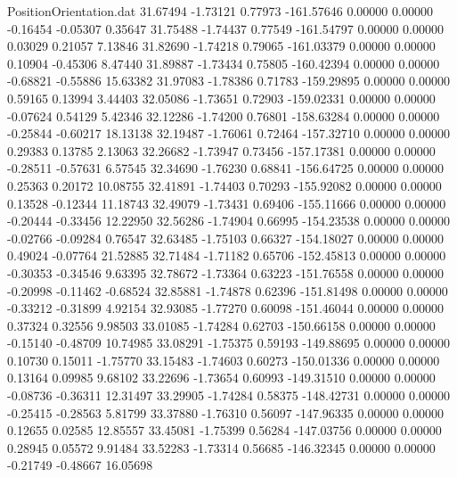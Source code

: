 \begin{filecontents}{PositionOrientation.dat}
  31.67494   -1.73121    0.77973  -161.57646    0.00000    0.00000   -0.16454   -0.05307    0.35647
  31.75488   -1.74437    0.77549  -161.54797    0.00000    0.00000    0.03029    0.21057    7.13846
  31.82690   -1.74218    0.79065  -161.03379    0.00000    0.00000    0.10904   -0.45306    8.47440
  31.89887   -1.73434    0.75805  -160.42394    0.00000    0.00000   -0.68821   -0.55886   15.63382
  31.97083   -1.78386    0.71783  -159.29895    0.00000    0.00000    0.59165    0.13994    3.44403
  32.05086   -1.73651    0.72903  -159.02331    0.00000    0.00000   -0.07624    0.54129    5.42346
  32.12286   -1.74200    0.76801  -158.63284    0.00000    0.00000   -0.25844   -0.60217   18.13138
  32.19487   -1.76061    0.72464  -157.32710    0.00000    0.00000    0.29383    0.13785    2.13063
  32.26682   -1.73947    0.73456  -157.17381    0.00000    0.00000   -0.28511   -0.57631    6.57545
  32.34690   -1.76230    0.68841  -156.64725    0.00000    0.00000    0.25363    0.20172   10.08755
  32.41891   -1.74403    0.70293  -155.92082    0.00000    0.00000    0.13528   -0.12344   11.18743
  32.49079   -1.73431    0.69406  -155.11666    0.00000    0.00000   -0.20444   -0.33456   12.22950
  32.56286   -1.74904    0.66995  -154.23538    0.00000    0.00000   -0.02766   -0.09284    0.76547
  32.63485   -1.75103    0.66327  -154.18027    0.00000    0.00000    0.49024   -0.07764   21.52885
  32.71484   -1.71182    0.65706  -152.45813    0.00000    0.00000   -0.30353   -0.34546    9.63395
  32.78672   -1.73364    0.63223  -151.76558    0.00000    0.00000   -0.20998   -0.11462   -0.68524
  32.85881   -1.74878    0.62396  -151.81498    0.00000    0.00000   -0.33212   -0.31899    4.92154
  32.93085   -1.77270    0.60098  -151.46044    0.00000    0.00000    0.37324    0.32556    9.98503
  33.01085   -1.74284    0.62703  -150.66158    0.00000    0.00000   -0.15140   -0.48709   10.74985
  33.08291   -1.75375    0.59193  -149.88695    0.00000    0.00000    0.10730    0.15011   -1.75770
  33.15483   -1.74603    0.60273  -150.01336    0.00000    0.00000    0.13164    0.09985    9.68102
  33.22696   -1.73654    0.60993  -149.31510    0.00000    0.00000   -0.08736   -0.36311   12.31497
  33.29905   -1.74284    0.58375  -148.42731    0.00000    0.00000   -0.25415   -0.28563    5.81799
  33.37880   -1.76310    0.56097  -147.96335    0.00000    0.00000    0.12655    0.02585   12.85557
  33.45081   -1.75399    0.56284  -147.03756    0.00000    0.00000    0.28945    0.05572    9.91484
  33.52283   -1.73314    0.56685  -146.32345    0.00000    0.00000   -0.21749   -0.48667   16.05698

\end{filecontents}
